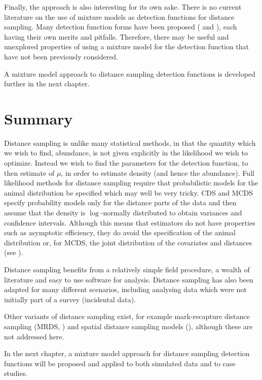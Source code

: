 Finally, the approach is also interesting for its own sake. There is no current literature on the use of mixture models as detection functions for distance sampling. Many detection function forms have been proposed (\cite{buckland92} and  \cite{gammadetfct}), each having their own merits and pitfalls. Therefore, there may be useful and unexplored properties of using a mixture model for the detection function that have not been previously considered.

A mixture model approach to distance sampling detection functions is developed further in the next chapter.

\section{Summary}
\label{cor-7s13}
Distance sampling is unlike many statistical methods, in that the quantity which we wish to find, abundance, is not given explicitly in the likelihood we wish to optimize. Instead we wish to find the parameters for the detection function, to then estimate of $\mu$, in order to estimate density (and hence the abundance). Full likelihood methods for distance sampling require that probabilistic models for the animal distribution be specified which may well be very tricky. CDS and MCDS specify probability models only for the distance parts of the data and then assume that the density is $\log$-normally\label{cor-r63} distributed to obtain variances and confidence intervals. Although this means that estimators do not have  properties such as asymptotic efficiency, they do avoid the specification of the animal distribution or, for MCDS, the joint distribution of the covariates and distances (see \cite[p. 6 and pp. 31-33]{ADS}). 

Distance sampling benefits from a relatively simple field procedure, a wealth of literature and easy to use software for analysis. Distance sampling has also been adapted for many different scenarios, including analysing data which were\label{cor-r1-7} not initially part of a survey (incidental data).

Other variants of distance sampling exist, for example mark-recapture distance sampling (MRDS, \cite{mrdspaper}) and spatial distance sampling models (\cite[chapter 4]{ADS}), although these are not addressed here.

In the next chapter, a mixture model approach for distance sampling detection functions will be proposed and applied to both simulated data and to case studies.
